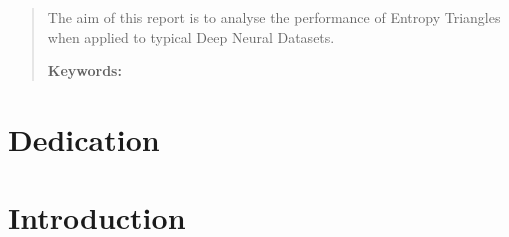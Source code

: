 \documentclass[12pt]{report}
\begin{document}
\newpage %
\thispagestyle{empty}
\mbox{}

\renewcommand\abstractname{\large\uppercase{Summary}}
\begin{abstract}
\thispagestyle{plain}
\setcounter{page}{3}
	
The aim of this report is to analyse the performance of Entropy Triangles when applied to typical Deep Neural Datasets.
	
	\textbf{Keywords:}
	
	\vfill
\end{abstract}
	\newpage %
	\thispagestyle{empty}
	\mbox{}


\chapter*{Dedication}

\setcounter{page}{5}
	
		
	\vfill
	
	\newpage %
	\thispagestyle{empty}
	\mbox{}
	


\tableofcontents
\thispagestyle{fancy}

\newpage %
\thispagestyle{empty}
\mbox{}

\listoffigures
\thispagestyle{fancy}

\newpage %
\thispagestyle{empty}
\mbox{}

\listoftables
\thispagestyle{fancy}

\newpage %
\thispagestyle{empty}
\mbox{}


\clearpage
{} %

\chapter{Introduction}
\end{document}
